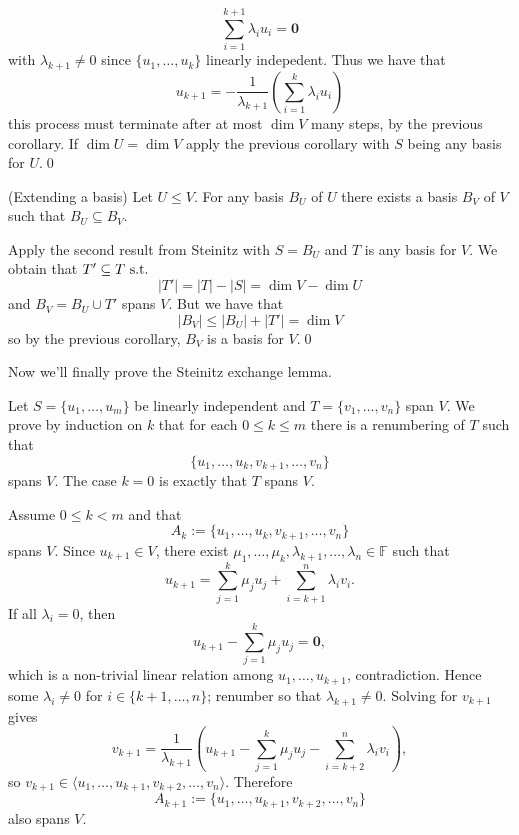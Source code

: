 \documentclass{article}
\newcommand{\F}{\mathbb{F}}
\begin{document}
\[
	\sum_{i=1}^{k+1}\lambda_i u_i=\mathbf 0
\]
with $ \lambda_{k+1}\ne 0 $ since $ \{u_1,\dots, u_k\} $ linearly indepedent. Thus we have that
\[
	u_{k+1}=-\frac 1{\lambda_{k+1}}\left(\sum_{i=1}^k\lambda_iu_i\right)
\]
this process must terminate after at most $ \dim V $ many steps, by the previous corollary. If $ \dim U=\dim V $ apply the previous corollary with $ S $ being any basis for $ U $.\qed
\begin{proposition}
	(Extending a basis) Let $ U\le V $. For any basis $ B_U $ of $ U $ there exists a basis $ B_V $ of $ V $ such that $ B_U\subseteq B_V $.
\end{proposition}
\pf Apply the second result from Steinitz with $ S=B_U $ and $ T $ is any basis for $ V $. We obtain that $ T'\subseteq T\text{ s.t.\ } $ 
\[
  |T'|=|T|-|S|=\dim V-\dim U
\]
and $ B_V=B_U\cup T' $ spans $ V $. But we have that
\[
  |B_V|\le |B_U|+|T'|=\dim V
\]
so by the previous corollary, $ B_V $ is a basis for $ V $.\qed\par
Now we'll finally prove the Steinitz exchange lemma.\par
\pf Let $ S=\{u_1,\dots,u_m\} $ be linearly independent and $ T=\{v_1,\dots,v_n\} $ span $ V $. We prove by induction on $ k $ that for each $ 0\le k\le m $ there is a renumbering of $ T $ such that
\[
	\{u_1,\dots,u_k,v_{k+1},\dots,v_n\}
\]
spans $ V $. The case $ k=0 $ is exactly that $ T $ spans $ V $.

Assume $ 0\le k<m $ and that
\[
	A_k:=\{u_1,\dots,u_k,v_{k+1},\dots,v_n\}
\]
spans $ V $. Since $ u_{k+1}\in V $, there exist $ \mu_1,\dots,\mu_k,\lambda_{k+1},\dots,\lambda_n\in\F $ such that
\[
	u_{k+1}=\sum_{j=1}^k\mu_j u_j+\sum_{i=k+1}^n\lambda_i v_i.
\]
If all $ \lambda_i=0 $, then
\[
	u_{k+1}-\sum_{j=1}^k\mu_j u_j=\mathbf 0,
\]
which is a non-trivial linear relation among $ u_1,\dots,u_{k+1} $, contradiction. Hence some $ \lambda_i\ne 0 $ for $ i\in\{k+1,\dots,n\} $; renumber so that $ \lambda_{k+1}\ne 0 $. Solving for $ v_{k+1} $ gives
\[
	v_{k+1}=\frac 1{\lambda_{k+1}}\left(u_{k+1}-\sum_{j=1}^k\mu_j u_j-\sum_{i=k+2}^n\lambda_i v_i\right),
\]
so $ v_{k+1}\in\langle u_1,\dots,u_{k+1},v_{k+2},\dots,v_n\rangle $. Therefore
\[
	A_{k+1}:=\{u_1,\dots,u_{k+1},v_{k+2},\dots,v_n\}
\]
also spans $ V $.
\end{document}
